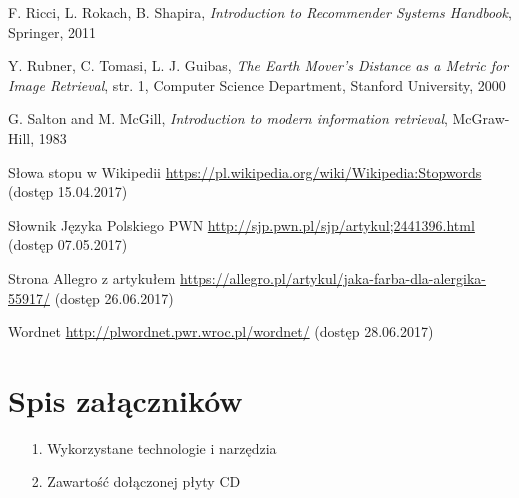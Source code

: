 \documentclass[pl]{minipw} %
\begin{document}
\begin{thebibliography}{30}
		F. Ricci, L. Rokach, B. Shapira,
		\emph{Introduction to Recommender Systems Handbook},
		Springer,
		2011
	
		Y. Rubner, C. Tomasi, L. J. Guibas,
		\emph{The Earth Mover's Distance as a Metric for Image Retrieval},
		str. 1,
		Computer Science Department, Stanford University,
		2000	

		G. Salton and M. McGill,
		\emph{Introduction to modern information retrieval},
		McGraw-Hill,
		1983
	
		Słowa stopu w Wikipedii
		\url{https://pl.wikipedia.org/wiki/Wikipedia:Stopwords}
		(dostęp 15.04.2017)
	
		Słownik Języka Polskiego PWN
		\url{http://sjp.pwn.pl/sjp/artykul;2441396.html}
		(dostęp 07.05.2017)
	
		Strona Allegro z artykułem
		\url{https://allegro.pl/artykul/jaka-farba-dla-alergika-55917/}
		(dostęp 26.06.2017)
		
		Wordnet
		\url{http://plwordnet.pwr.wroc.pl/wordnet/}
		(dostęp 28.06.2017)
\end{thebibliography}






\listoffigures


\renewcommand{\listtablename}{Spis tabel}
\listoftables


\chapter*{Spis załączników}
\begin{enumerate}
\item[1.] Wykorzystane technologie i narzędzia
\item[2.] Zawartość dołączonej płyty CD
\end{enumerate}
\end{document}
